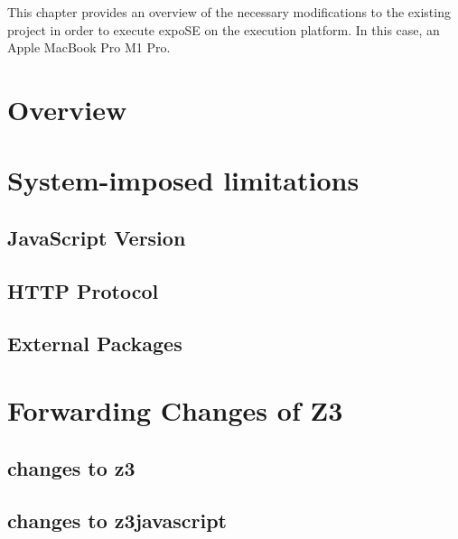 This chapter provides an overview of the necessary modifications to the existing project in order to execute expoSE on the execution platform. In this case, an Apple MacBook Pro M1 Pro. 

\section{Overview}
\section{System-imposed limitations}
\label{sec:limits}

\subsection{JavaScript Version}
\label{sec:jsversion}

\subsection{HTTP Protocol}
\label{sec:httpprot}

\subsection{External Packages}
\label{sec:externalpack}

\section{Forwarding Changes of Z3}
\subsection{changes to z3}
\subsection{changes to z3javascript}